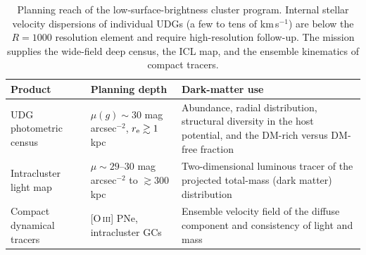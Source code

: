 \begin{table}[htbp]
\centering
\sffamily\small
\begin{tabularx}{\textwidth}{@{}p{3.6cm}p{3.2cm}X@{}}
\toprule
\textbf{Product} & \textbf{Planning depth} & \textbf{Dark-matter use}\\
\midrule
UDG photometric census & $\mu(g)\sim30$ mag\,arcsec$^{-2}$, $r_{\rm e}\gtrsim1$\,kpc & Abundance, radial distribution, structural diversity in the host potential, and the DM-rich versus DM-free fraction\\
Intracluster light map & $\mu\sim29$--$30$ mag\,arcsec$^{-2}$ to $\gtrsim300$\,kpc & Two-dimensional luminous tracer of the projected total-mass (dark matter) distribution\\
Compact dynamical tracers & [O\,\textsc{iii}] PNe, intracluster GCs & Ensemble velocity field of the diffuse component and consistency of light and mass\\
\bottomrule
\end{tabularx}
\caption{Planning reach of the low-surface-brightness cluster program. Internal stellar velocity dispersions of individual UDGs (a few to tens of km\,s$^{-1}$) are below the $R=1000$ resolution element and require high-resolution follow-up. The mission supplies the wide-field deep census, the ICL map, and the ensemble kinematics of compact tracers.}
\label{tab:lsbreach}
\end{table}

